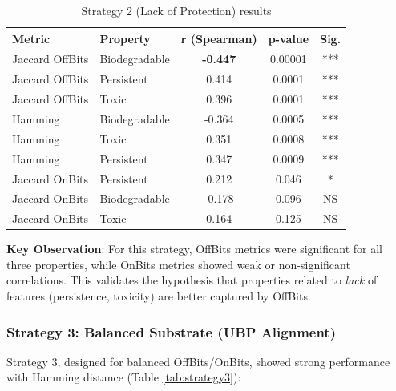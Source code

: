 \documentclass[11pt,letterpaper]{article}
\begin{document}
\begin{table}[H]
\centering
\caption{Strategy 2 (Lack of Protection) results}
\label{tab:strategy2}
\small
\begin{tabular}{llccc}
\toprule
\textbf{Metric} & \textbf{Property} & \textbf{r (Spearman)} & \textbf{p-value} & \textbf{Sig.} \\
\midrule
Jaccard OffBits & Biodegradable & \textbf{-0.447} & 0.00001 & *** \\
Jaccard OffBits & Persistent & 0.414 & 0.0001 & *** \\
Jaccard OffBits & Toxic & 0.396 & 0.0001 & *** \\
Hamming & Biodegradable & -0.364 & 0.0005 & *** \\
Hamming & Toxic & 0.351 & 0.0008 & *** \\
Hamming & Persistent & 0.347 & 0.0009 & *** \\
Jaccard OnBits & Persistent & 0.212 & 0.046 & * \\
Jaccard OnBits & Biodegradable & -0.178 & 0.096 & NS \\
Jaccard OnBits & Toxic & 0.164 & 0.125 & NS \\
\bottomrule
\end{tabular}
\end{table}

\textbf{Key Observation}: For this strategy, OffBits metrics were significant for all three properties, while OnBits metrics showed weak or non-significant correlations. This validates the hypothesis that properties related to \textit{lack} of features (persistence, toxicity) are better captured by OffBits.

\subsubsection{Strategy 3: Balanced Substrate (UBP Alignment)}

Strategy 3, designed for balanced OffBits/OnBits, showed strong performance with Hamming distance (Table \ref{tab:strategy3}):
\end{document}
